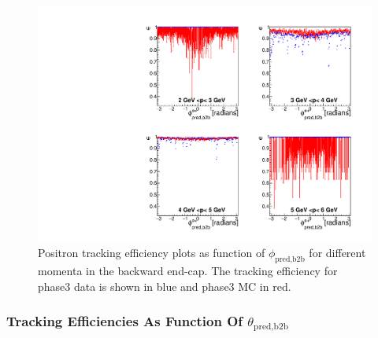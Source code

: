 \documentclass[a4paper,11pt,twosided,final,german,openbib,pdftex,listof=totoc,bibliography=totoc]{scrbook}
\begin{document}
\begin{figure}[!htbp]
	\centering
	\includegraphics[width=\textwidth]{Plots/master3/xPMPhiepECP3}
	\caption[Momentum $\phi_{\textrm{pred,b2b}}$ Positron Backward End-Cap Efficiency Phase3]{Positron tracking efficiency plots as function of $\phi_{\textrm{pred,b2b}}$ for different momenta in the backward end-cap. The tracking efficiency for phase3 data is shown in blue and phase3 MC in red.}
	
	\label{plt:xPMPhiepEC3}
\end{figure}

\newpage

\subsubsection{Tracking Efficiencies As Function Of $\theta_{\textrm{pred,b2b}}$}
\end{document}
